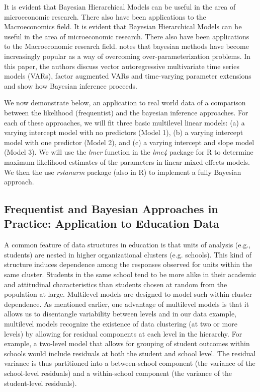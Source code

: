 It is evident that Bayesian Hierarchical Models can be useful in the area of microeconomic research. There also have been applications to the Macroeconomics field. It is evident that Bayesian Hierarchical Models can be useful in the area of microeconomic research. There also have been applications to the Macroeconomic research field. \cite{ koop2010bayesian} notes that bayesian methods have become increasingly popular as a way of overcoming over-parameterization problems. In this paper, the authors discuss vector autoregressive multivariate time
series models (VARs), factor augmented VARs and time-varying parameter extensions and show how Bayesian inference proceeds. 

We now demonstrate below, an application to real world data of a comparison between the likelihood (frequentist)  and the bayesian inference approaches. For each of these approaches, we will fit three basic multilevel linear models: (a) a varying intercept model with no predictors (Model 1), (b) a varying intercept model with one predictor (Model 2), and (c)  a varying intercept and slope model (Model 3). We will use the \textit{lmer} function in the \textit{lme4} package for R to determine maximum likelihood estimates of the parameters in linear mixed-effects models. We then the use \textit{rstanarm} package (also in R) to implement a fully Bayesian approach.


 

\subsection{Frequentist and Bayesian Approaches in Practice: Application to Education Data}

A common feature of data structures in education is that units of analysis (e.g., students) are nested in higher organizational clusters (e.g. schools). This kind of structure induces dependence among the responses observed for units within the same cluster. Students in the same school tend to be more alike in their academic and attitudinal characteristics than students chosen at random from the population at large. Multilevel models are designed to model such within-cluster dependence. As mentioned earlier, one advantage of multilevel models is that it allows us to disentangle variability between levels and in our data example,  multilevel models recognize the existence of data clustering (at two or more levels) by allowing for residual components at each level in the hierarchy. For example, a two-level model that allows for grouping of student outcomes within schools would include residuals at both the student and school level. The residual variance is thus partitioned into a between-school component (the variance of the school-level residuals) and a within-school component (the variance of the student-level residuals). 


